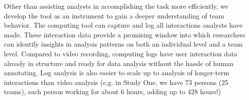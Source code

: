 Other than assisting analysts in accomplishing the task more efficiently, we develop the tool as an instrument to gain a deeper understanding of team behavior. The computing tool can capture and log all interactions analysts have made. These interaction data provide a promising window into which researchers can identify insights in analysis patterns on both an individual level and a team level. Compared to video recording, computing logs have user interaction data already in structure and ready for data analysis without the hassle of human annotating. Log analysis is also easier to scale up to analysis of longer-term interactions than video analysis (e.g. in Study One, we have 73 persons (25 teams),  each person working for about 6 hours, adding up to 428 hours!)
